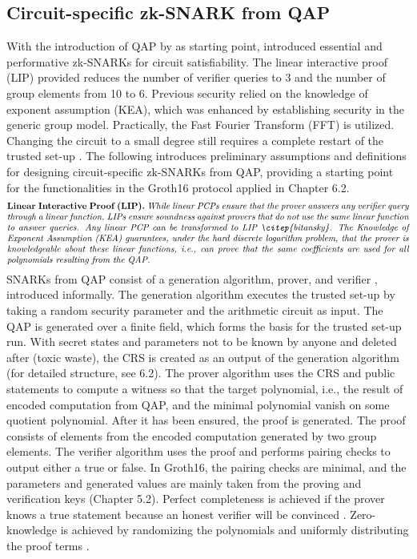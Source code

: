 \subsection{Circuit-specific zk-SNARK from QAP}
With the introduction of QAP by \citet{GennaroLinPCP} as starting point, \citet{Groth2016OnTS} introduced essential and performative zk-SNARKs for circuit satisfiability. The linear interactive proof (LIP) provided reduces the number of verifier queries to 3 and the number of group elements from 10 to 6. Previous security relied on the knowledge of exponent assumption (KEA), which was enhanced by establishing security in the generic group model. Practically, the Fast Fourier Transform (FFT) is utilized. Changing the circuit to a small degree still requires a complete restart of the trusted set-up \citep{Thaler}. The following introduces preliminary assumptions and definitions for designing circuit-specific zk-SNARKs from QAP, providing a starting point for the functionalities in the Groth16 protocol applied in Chapter 6.2.
\begin{align*}
    \text{\parbox{450pt}{\textbf{Linear Interactive Proof (LIP).} \textit{While linear PCPs ensure that the prover answers any verifier query through a linear function, LIPs ensure soundness against provers that do not use the same linear function to answer queries. Any linear PCP can be transformed to LIP \citep{bitansky}. The Knowledge of Exponent Assumption (KEA) guarantees, under the hard discrete logarithm problem, that the prover is knowledgeable about these linear functions, i.e., can prove that the same coefficients are used for all polynomials resulting from the QAP.}}}
\end{align*}
SNARKs from QAP consist of a generation algorithm, prover, and verifier \citep{Groth2016OnTS, Guo, Benamara}, introduced informally.
The generation algorithm executes the trusted set-up by taking a random security parameter and the arithmetic circuit as input. The QAP is generated over a finite field, which forms the basis for the trusted set-up run. With secret states and parameters not to be known by anyone and deleted after (toxic waste), the CRS is created as an output of the generation algorithm (for detailed structure, see 6.2). The prover algorithm uses the CRS and public statements to compute a witness so that the target polynomial, i.e., the result of encoded computation from QAP, and the minimal polynomial vanish on some quotient polynomial. After it has been ensured, the proof is generated. The proof consists of elements from the encoded computation generated by two group elements. The verifier algorithm uses the proof and performs pairing checks to output either a true or false. In Groth16, the pairing checks are minimal, and the parameters and generated values are mainly taken from the proving and verification keys (Chapter 5.2). Perfect completeness is achieved if the prover knows a true statement because an honest verifier will be convinced \citep{Guo}. Zero-knowledge is achieved by randomizing the polynomials and uniformly distributing the proof terms \citep{Groth2016OnTS, Groth2010ShortPN}.

